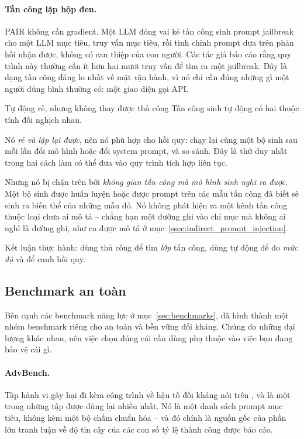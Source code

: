 \paragraph{Tấn công lặp hộp đen.} PAIR \cite{chao2023pair} không cần gradient. Một LLM đóng vai kẻ tấn công sinh prompt jailbreak cho một LLM mục tiêu, truy vấn mục tiêu, rồi tinh chỉnh prompt dựa trên phản hồi nhận được, không có can thiệp của con người. Các tác giả báo cáo rằng quy trình này thường cần ít hơn hai mươi truy vấn để tìm ra một jailbreak. Đây là dạng tấn công đáng lo nhất về mặt vận hành, vì nó chỉ cần đúng những gì một người dùng bình thường có: một giao diện gọi API.

\begin{deepdive}{Tự động rẻ, nhưng không thay được thủ công}
Tấn công sinh tự động có hai thuộc tính đối nghịch nhau.

Nó \emph{rẻ và lặp lại được}, nên nó phù hợp cho hồi quy: chạy lại cùng một bộ sinh sau mỗi lần đổi mô hình hoặc đổi system prompt, và so sánh. Đây là thứ duy nhất trong hai cách làm có thể đưa vào quy trình tích hợp liên tục.

Nhưng nó bị chặn trên bởi \emph{không gian tấn công mà mô hình sinh nghĩ ra được}. Một bộ sinh được huấn luyện hoặc được prompt trên các mẫu tấn công đã biết sẽ sinh ra biến thể của những mẫu đó. Nó không phát hiện ra một kênh tấn công thuộc loại chưa ai mô tả -- chẳng hạn một đường ghi vào chỉ mục mà không ai nghĩ là đường ghi, như ca được mô tả ở mục~\ref{ssec:indirect_prompt_injection}.

Kết luận thực hành: dùng thủ công để tìm \emph{lớp} tấn công, dùng tự động để đo \emph{mức độ} và để canh hồi quy.
\end{deepdive}

\subsection{Benchmark an toàn}
\label{ssec:safety_benchmarks}

Bên cạnh các benchmark năng lực ở mục~\ref{sec:benchmarks}, đã hình thành một nhóm benchmark riêng cho an toàn và bền vững đối kháng. Chúng đo những đại lượng khác nhau, nên việc chọn đúng cái cần dùng phụ thuộc vào việc bạn đang bảo vệ cái gì.

\paragraph{AdvBench.} Tập hành vi gây hại đi kèm công trình về hậu tố đối kháng nói trên \cite{zou2023universal}, và là một trong những tập được dùng lại nhiều nhất. Nó là một danh sách prompt mục tiêu, không kèm một bộ chấm chuẩn hóa -- và đó chính là nguồn gốc của phần lớn tranh luận về độ tin cậy của các con số tỷ lệ thành công được báo cáo.

